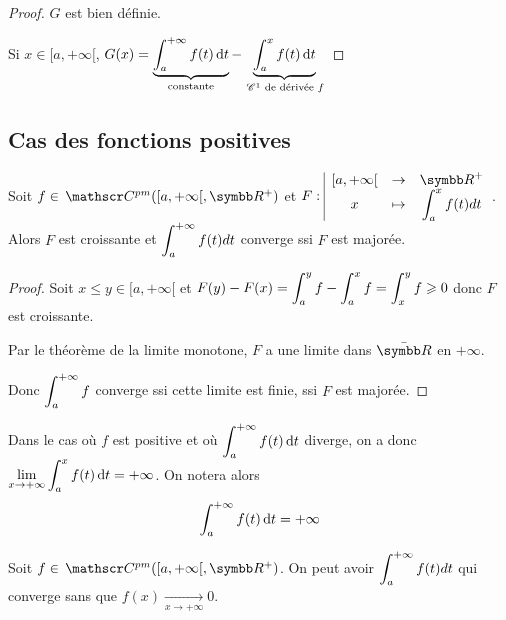 \begin{proof}
    $G$ est bien définie. 

    Si $x \in [a, + \infty[$, $G(x) = \displaystyle \underbrace{\int_{a}^{+ \infty } f(t) \,\mathrm{d}t}_{\text{constante}} - \underbrace{\int_a^x f(t) \,\mathrm{d}t}_{\,\mathscr C^{1} \text{ de dérivée } f}$
\end{proof}

\subsection{Cas des fonctions positives}

\begin{proposition}{}{}
    Soit $f \in \mc{pm}([a, + \infty[, \R^+)$ et $\fonction{F}{[a, + \infty[}{\R^+}{x}{\int_a^x f(t) dt}$.
    Alors $F$ est croissante et $\displaystyle \int_a^{+ \infty} f(t) dt$ converge ssi $F$ est majorée.
\end{proposition}

\begin{proof}
    Soit $x \leqslant y \in [a, +\infty[$ et $F(y) - F(x) = \displaystyle \int_a^y f - \int_a^x f = \int_x^y f \geqslant 0$ donc $F$ est croissante.

    Par le théorème de la limite monotone, $F$ a une limite dans $\bar{\R}$ en $+\infty$.

    Donc $\displaystyle \int_{a }^{+\infty   } f$ converge ssi cette limite est finie, ssi $F$ est majorée.
\end{proof}

\begin{remarque}
    Dans le cas où $f$ est positive et où $\displaystyle \int_{a }^{+ \infty   } f(t) \,\mathrm{d}t$ diverge, on a 
    donc $\displaystyle \lim_{x \to + \infty   } \int_{a }^{x } f(t) \,\mathrm{d}t = + \infty$.
    On notera alors 
    $$\int_{a }^{+ \infty   } f(t) \,\mathrm{d}t = + \infty$$
\end{remarque}



\begin{proposition}{}{}
    Soit $f \in \mc{pm}([a, + \infty[, \R^+)$. On peut avoir $\displaystyle \int_a^{+ \infty} f(t) dt$ 
    qui converge sans que $f(x) \xrightarrow[x \to + \infty   ]{} 0$.
\end{proposition}

